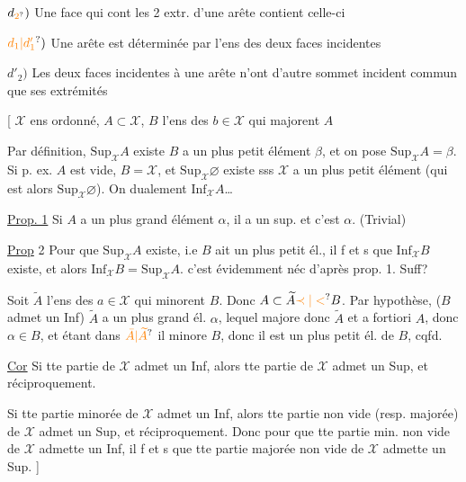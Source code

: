 $d_{\unsure{2}})$ Une face qui cont les 2 extr. d'une arête contient celle-ci

$\unsure{d_1|d'_1})$ Une arête est déterminée par l'ens des deux
faces incidentes

$d'_2)$ Les deux faces incidentes à une arête n'ont d'autre
sommet incident commun que ses extrémités

[ $\mathcal X$ ens ordonné, $A\subset\mathcal X$, $B$ l'ens des $b\in\mathcal X$ qui majorent $A$

\deleted{\unsure{$\exists$}} Par définition, $\mathrm{Sup}_{\mathcal X}A$ existe  $B$ a un plus petit élément $\beta$,
et on pose \deleted{$\unsure{\beta=}$} $\mathrm{Sup}_{\mathcal X}A=\beta$. Si p. ex. $A$ est vide, $B=\mathcal X$, et
$\mathrm{Sup}_{\mathcal X}\varnothing$ existe sss $\mathcal X$ a un plus petit élément (qui
est alors $\mathrm{Sup}_{\mathcal X}\varnothing$). On  dualement $\mathrm{Inf}_{\mathcal X}A$\ldots

\uline{Prop. 1} Si $A$ a un plus grand élément $\alpha$, il a un sup. et c'est $\alpha$. (Trivial)

\uline{Prop} 2 Pour que $\mathrm{Sup}_{\mathcal X}A$ existe, i.e $B$ ait un plus petit
él., il f et s que $\mathrm{Inf}_{\mathcal X}B$ existe, et alors
$\mathrm{Inf}_{\mathcal X}B=\mathrm{Sup}_{\mathcal X}A$. c'est évidemment néc  d'après prop. 1. Suff?

Soit $\widetilde A$ l'ens des $a\in\mathcal X$ qui minorent $B$. Donc
$A\subset\widetilde A\unsure{\prec|<}B$. Par hypothèse, ($B$ admet un Inf) $\widetilde A$ a un
plus grand él. $\alpha$, lequel majore donc $\widetilde A$ et a fortiori
$A$, donc $\alpha\in B$, et étant dans $\unsure{\bar A|\widetilde A}$ il minore $B$, donc il
est un plus petit él. de $B$, cqfd.

\uline{ Cor} Si tte partie de $\mathcal X$ admet un Inf, alors tte
partie de $\mathcal X$ admet un Sup, et réciproquement.

Si tte partie  minorée  de $\mathcal X$ admet un
Inf, alors tte partie non vide (resp. majorée) de
$\mathcal X$ admet un Sup, et réciproquement. Donc
pour que tte partie min. non vide de $\mathcal X$ admette
un Inf, il f et s que tte partie majorée non
vide de $\mathcal X$ admette un Sup. \hfill]

